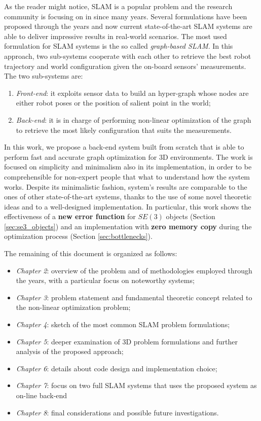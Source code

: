 As the reader might notice, SLAM is a popular problem and the research community is focusing on in since many years. Several formulations have been proposed through the years and now current state-of-the-art SLAM systems are able to deliver impressive results in real-world scenarios. The most used formulation for SLAM systems is the so called \textit{graph-based SLAM}. In this approach, two sub-systems cooperate with each other to retrieve the best robot trajectory and world configuration given the on-board sensors' measurements. The two sub-systems are:

\begin{enumerate}
    \item \textit{Front-end}: it exploits sensor data to build an hyper-graph whose nodes are either robot poses or the position of salient point in the world;
    \item \textit{Back-end}: it is in charge of performing non-linear optimization of the graph to retrieve the most likely configuration that suits the measurements.
\end{enumerate}

In this work, we propose a back-end system built from scratch that is able to perform fast and accurate graph optimization for 3D environments. The work is focused on simplicity and minimalism also in its implementation, in order to be comprehensible for non-expert people that what to understand how the system works. Despite its minimalistic fashion, system's results are comparable to the ones of other state-of-the-art systems, thanks to the use of some novel theoretic ideas and to a well-designed implementation. In particular, this work shows the effectiveness of a \textbf{new error function} for $SE(3)$ objects (Section \ref{sec:se3_objects}) and an implementation with \textbf{zero memory copy} during the optimization process (Section \ref{sec:bottlenecks}).

\vspace{20px}

\noindent The remaining of this document is organized as follows:

\begin{itemize}
    \item \textit{Chapter 2}: overview of the problem and of methodologies employed through the years, with a particular focus on noteworthy systems;
    \item \textit{Chapter 3}: problem statement and fundamental theoretic concept related to the non-linear optimization problem;
    \item \textit{Chapter 4}: sketch of the most common SLAM problem formulations;
    \item \textit{Chapter 5}: deeper examination of 3D problem formulations and further analysis of the proposed approach;
    \item \textit{Chapter 6}: details about code design and implementation choice;
    \item \textit{Chapter 7}: focus on two full SLAM systems that uses the proposed system as on-line back-end
    \item \textit{Chapter 8}: final considerations and possible future investigations. 
\end{itemize}
